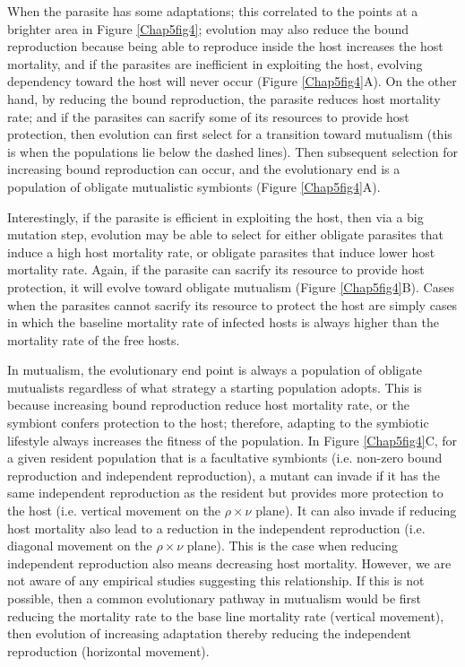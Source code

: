 \documentclass[11.5pt]{article}
\begin{document}
\medskip

When the parasite has some adaptations; this correlated to the points at a brighter area in Figure \ref{Chap5fig4}; evolution may also reduce the bound reproduction because being able to reproduce inside the host increases the host mortality, and if the parasites are inefficient in exploiting the host, evolving dependency toward the host will never occur (Figure \ref{Chap5fig4}A). On the other hand, by reducing the bound reproduction, the parasite reduces host mortality rate; and if the parasites can sacrify some of its resources to provide host protection, then evolution can first select for a transition toward mutualism (this is when the populations lie below the dashed lines). Then subsequent selection for increasing bound reproduction can occur, and the evolutionary end is a population of obligate mutualistic symbionts (Figure \ref{Chap5fig4}A). 

\medskip

Interestingly, if the parasite is efficient in exploiting the host, then via a big mutation step, evolution may be able to select for either obligate parasites that induce a high host mortality rate, or obligate parasites that induce lower host mortality rate. Again, if the parasite can sacrify its resource to provide host protection, it will evolve toward obligate mutualism (Figure \ref{Chap5fig4}B). Cases when the parasites cannot sacrify its resource to protect the host are simply cases in which the baseline mortality rate of infected hosts is always higher than the mortality rate of the free hosts.

\medskip

In mutualism, the evolutionary end point is always a population of obligate mutualists regardless of what strategy a starting population adopts. This is because increasing bound reproduction reduce host mortality rate, or the symbiont confers protection to the host; therefore, adapting to the symbiotic lifestyle always increases the fitness of the population. In Figure \ref{Chap5fig4}C, for a given resident population that is a facultative symbionts (i.e. non-zero bound reproduction and independent reproduction), a mutant can invade if it has the same independent reproduction as the resident but provides more protection to the host (i.e. vertical movement on the $\rho \times \nu$ plane). It can also invade if reducing host mortality also lead to a reduction in the independent reproduction (i.e. diagonal movement on the $\rho \times \nu$ plane). This is the case when reducing independent reproduction also means decreasing host mortality. However, we are not aware of any empirical studies suggesting this relationship. If this is not possible, then a common evolutionary pathway in mutualism would be first reducing the mortality rate to the base line mortality rate (vertical movement), then evolution of increasing adaptation thereby reducing the independent reproduction (horizontal movement).
\end{document}
